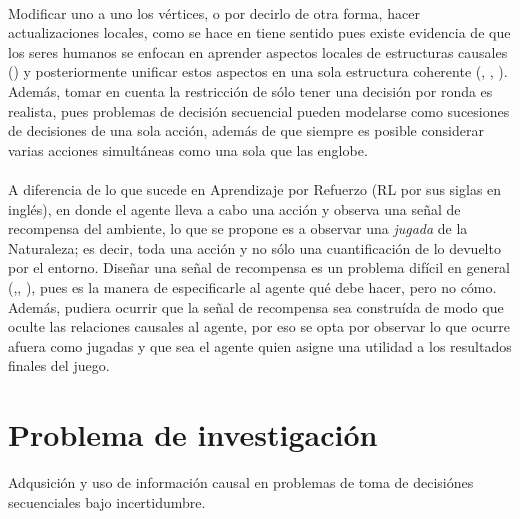 \documentclass[11pt]{article}
\theoremstyle{plain}
\begin{document}
\\
\indent Modificar uno a uno los vértices, o por decirlo de otra forma, hacer actualizaciones locales, como se hace en \cite{lattimoreNIPS2016} tiene sentido pues existe evidencia de que los seres humanos se enfocan en aprender aspectos locales de estructuras causales (\cite{danks2014unifying}) y posteriormente unificar estos aspectos en una sola estructura coherente (\cite{fernbach2009causal}, \cite{waldmann2008causal}, \cite{wellen2012learning}). Además, tomar en cuenta la restricción de sólo tener una decisión por ronda es realista, pues problemas de decisión secuencial pueden modelarse como sucesiones de decisiones de una sola acción, además de que siempre es posible considerar varias acciones simultáneas como una sola que las englobe.\\
\\
\indent A diferencia de lo que sucede en Aprendizaje por Refuerzo (RL por sus siglas en inglés), en donde el agente lleva a cabo una acción y observa una señal de recompensa del ambiente, lo que se propone es a observar una \textit{jugada} de la Naturaleza; es decir, toda una acción y no sólo una cuantificación de lo devuelto por el entorno. Diseñar una señal de recompensa es un problema difícil en general (\cite{sutton1998reinforcement},\cite{dewey2014reinforcement}, \cite{DRLnotwork}), pues es la manera de especificarle al agente qué debe hacer, pero no cómo. Además, pudiera ocurrir que la señal de recompensa sea construída de modo que oculte las relaciones causales al agente, por eso se opta por observar lo que ocurre afuera como jugadas y que sea el agente quien asigne una utilidad a los resultados finales del juego.


\section{Problema de investigación}
Adqusición y uso de información causal en problemas de toma de decisiónes secuenciales bajo incertidumbre.
\end{document}
